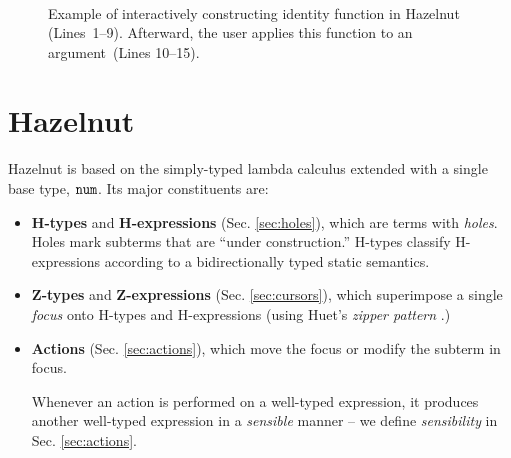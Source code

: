 \documentclass{llncs}
\begin{document}
\begin{figure}[t]
\[\begin{array}{|c||c|c||l|l|}
\end{array}
\]
\caption{Example of interactively constructing identity function in Hazelnut (Lines~1--9).
  Afterward, the user applies this function to an argument~(Lines 10--15).}
\label{fig:first-example}
\end{figure}

\section{Hazelnut}
\label{sec:hazel}
Hazelnut is based on the simply-typed lambda calculus extended with a single base type, $\texttt{num}$. Its major constituents are:
\begin{itemize}
\item \textbf{H-types} and \textbf{H-expressions} (Sec. \ref{sec:holes}), which are terms with \emph{holes}. Holes mark subterms that are ``under construction.'' H-types classify H-expressions according to a {bidirectionally typed} static semantics.
\item \textbf{Z-types} and \textbf{Z-expressions} (Sec. \ref{sec:cursors}), which superimpose a single \emph{focus} onto H-types and H-expressions (using Huet's \emph{zipper pattern} \cite{JFP::Huet1997}.)
\item \textbf{Actions} (Sec. \ref{sec:actions}), which move the focus or modify the subterm in focus.

Whenever an action is performed on a well-typed expression, it produces another well-typed expression in a \emph{sensible} manner -- we define \emph{sensibility} in Sec. \ref{sec:actions}.
\end{itemize}
\end{document}
